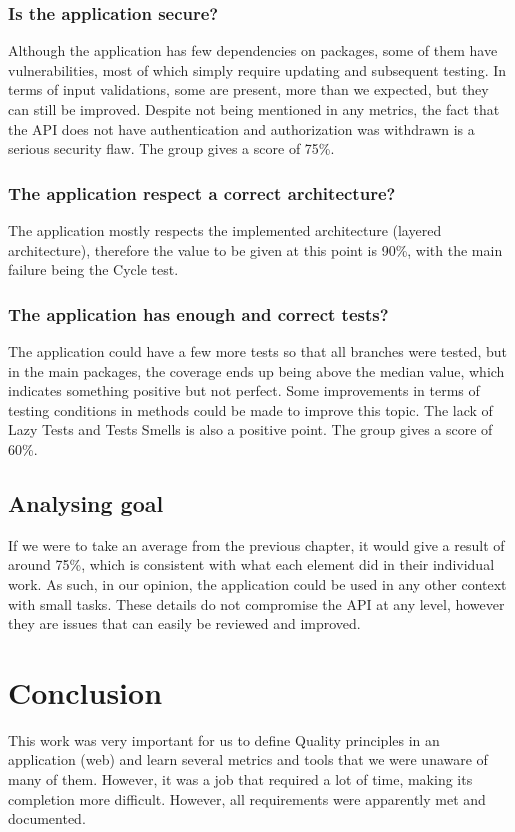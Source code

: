 \documentclass[a4paper,11pt,openright,BCOR=15mm]{scrbook}
\begin{document}
			\subsection{Is the application secure?}			
				Although the application has few dependencies on packages, some of them have vulnerabilities, most of which simply require updating and subsequent testing.		
				In terms of input validations, some are present, more than we expected, but they can still be improved.			
				Despite not being mentioned in any metrics, the fact that the API does not have authentication and 	authorization was withdrawn is a serious security flaw.		
				The group gives a score of 75\%.
			
			\subsection{The application respect a correct architecture?}		
				The application mostly respects the implemented architecture (layered architecture), therefore the value to be given at this point is 90\%, with the main failure being the Cycle test.
			
			\subsection{The application has enough and correct tests?}
				The application could have a few more tests so that all branches were tested, but in the main packages, the coverage ends up being above the median value, which indicates something positive but not perfect. Some improvements in terms of testing conditions in methods could be made to improve this topic.
				The lack of Lazy Tests and Tests Smells is also a positive point.
				The group gives a score of 60\%.
			
	\section{Analysing goal}

	If we were to take an average from the previous chapter, it would give a result of around 75\%, which is consistent with what each element did in their individual work.
	As such, in our opinion, the application could be used in any other context with small tasks. These details do not compromise the API at any level, however they are issues that can easily be reviewed and improved.
	
	\chapter{Conclusion}

	This work was very important for us to define Quality principles in an application (web) and learn several metrics and tools that we were unaware of many of them.
	However, it was a job that required a lot of time, making its completion more difficult. However, all requirements were apparently met and documented.


	
	
	\renewcommand\bibname{References}
	
	\label{references}
	
\end{document}

